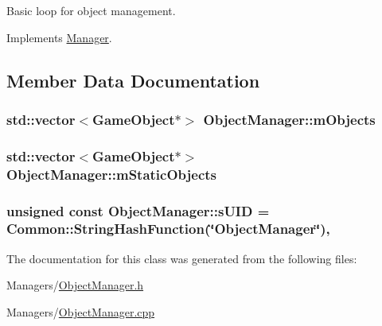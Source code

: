 Basic loop for object management. 



Implements \hyperlink{classManager_adeae9d4bc705f47837c2eece7d9eb523}{Manager}.



\subsection{Member Data Documentation}
\subsubsection[{\texorpdfstring{m\+Objects}{mObjects}}]{\setlength{\rightskip}{0pt plus 5cm}std\+::vector$<${\bf Game\+Object}$\ast$$>$ Object\+Manager\+::m\+Objects\hspace{0.3cm}{\ttfamily [private]}}\hypertarget{classObjectManager_aa40dab99ba0c0844950a2119b7e57069}{}\label{classObjectManager_aa40dab99ba0c0844950a2119b7e57069}
\subsubsection[{\texorpdfstring{m\+Static\+Objects}{mStaticObjects}}]{\setlength{\rightskip}{0pt plus 5cm}std\+::vector$<${\bf Game\+Object}$\ast$$>$ Object\+Manager\+::m\+Static\+Objects\hspace{0.3cm}{\ttfamily [private]}}\hypertarget{classObjectManager_aa32d62ceac52a5793f92fbc2ea2a62f2}{}\label{classObjectManager_aa32d62ceac52a5793f92fbc2ea2a62f2}
\subsubsection[{\texorpdfstring{s\+U\+ID}{sUID}}]{\setlength{\rightskip}{0pt plus 5cm}unsigned const Object\+Manager\+::s\+U\+ID = {\bf Common\+::\+String\+Hash\+Function}(\char`\"{}Object\+Manager\char`\"{})\hspace{0.3cm}{\ttfamily [static]}, {\ttfamily [private]}}\hypertarget{classObjectManager_a8422a172c8048e3371db75c10de611a2}{}\label{classObjectManager_a8422a172c8048e3371db75c10de611a2}


The documentation for this class was generated from the following files\+:\begin{DoxyCompactItemize}
\item 
Managers/\hyperlink{ObjectManager_8h}{Object\+Manager.\+h}\item 
Managers/\hyperlink{ObjectManager_8cpp}{Object\+Manager.\+cpp}\end{DoxyCompactItemize}
